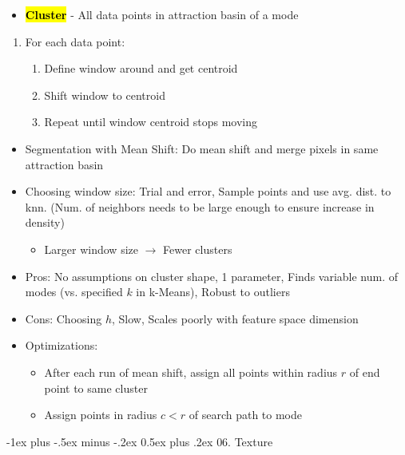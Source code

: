 \documentclass{article}
\makeatletter
\renewcommand{\section}{\@startsection{section}{1}{0mm}%
    {-1ex plus -.5ex minus -.2ex}%
    {0.5ex plus .2ex}%
{\normalfont\large\bfseries}}
\newcommand{\keyword}[2]{\sethlcolor{highlight}\hl{\textbf{#1}} - #2}
\makeatother
\begin{document}
\begin{multicols*}{4}
\begin{itemize}
\begin{itemize}
        \item \keyword{Cluster}{All data points in attraction basin of a mode}
    \end{itemize}
    \begin{enumerate}
        \item For each data point:
        \begin{enumerate}
            \item Define window around and get centroid
            \item Shift window to centroid
            \item Repeat until window centroid stops moving
        \end{enumerate}
    \end{enumerate}
    \begin{itemize}
        \item Segmentation with Mean Shift: Do mean shift and merge pixels in same attraction basin
        \item Choosing window size: Trial and error, Sample points and use avg. dist. to knn. (Num. of neighbors needs to be large enough to ensure increase in density)
        \begin{itemize}
            \item Larger window size $\rightarrow$ Fewer clusters
        \end{itemize}
        \item Pros: No assumptions on cluster shape, 1 parameter, Finds variable num. of modes (vs. specified $k$ in k-Means), Robust to outliers
        \item Cons: Choosing $h$, Slow, Scales poorly with feature space dimension
        \item Optimizations:
        \begin{itemize}
            \item After each run of mean shift, assign all points within radius $r$ of end point to same cluster
            \item Assign points in radius $c < r$ of search path to mode
        \end{itemize}
    \end{itemize}
\end{itemize}

\section{06. Texture}


\end{multicols*}
\end{document}
